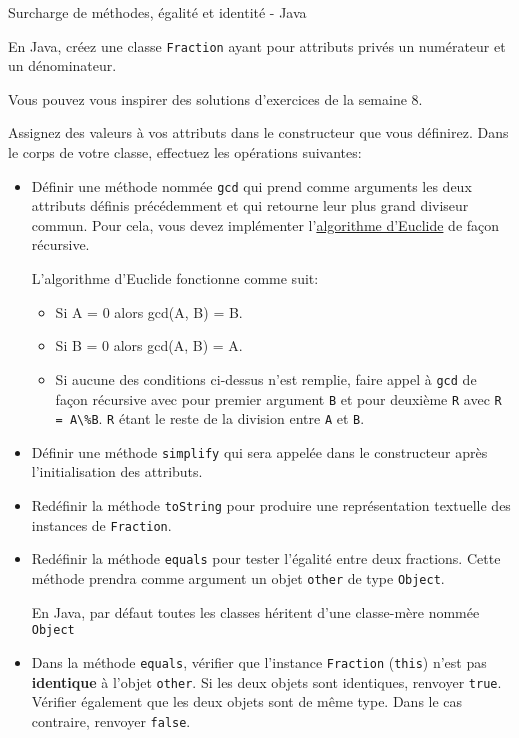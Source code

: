 \begin{Exercice}[30 minutes]{Surcharge de méthodes, égalité et identité - Java}

En Java, créez une classe \lstinline{Fraction} ayant pour attributs privés un numérateur et un dénominateur. 
\begin{conseil}
	Vous pouvez vous inspirer des solutions d'exercices de la semaine 8.
\end{conseil}
Assignez des valeurs à vos attributs dans le constructeur que vous définirez. Dans le corps de votre classe, effectuez les opérations suivantes:
\begin{itemize}
	\item Définir une méthode nommée \lstinline{gcd} qui prend comme arguments les deux attributs définis précédemment et qui retourne leur plus grand diviseur commun. Pour cela, vous devez implémenter l'\href{https://fr.wikipedia.org/wiki/Algorithme_d%27Euclide#:~:text=le%20code%5D-,Principe}{algorithme d'Euclide} de façon récursive.
	\begin{conseil}
		L'algorithme d'Euclide fonctionne comme suit:
		\begin{itemize}
			\item Si A = 0 alors gcd(A, B) = B.
			\item Si B = 0 alors gcd(A, B) = A.
			\item Si aucune des conditions ci-dessus n'est remplie, faire appel à \lstinline{gcd} de façon récursive avec pour premier argument \lstinline{B} et pour deuxième \lstinline{R} avec \lstinline{R = A\%B}. \lstinline{R} étant le reste de la division entre \lstinline{A} et \lstinline{B}.
		\end{itemize}
	\end{conseil}
	\item Définir une méthode \lstinline{simplify} qui sera appelée dans le constructeur après l'initialisation des attributs. 
	\item Redéfinir la méthode \lstinline{toString} pour produire une représentation textuelle des instances de \lstinline{Fraction}.
	\item Redéfinir la méthode \lstinline{equals} pour tester l'égalité entre deux fractions. Cette méthode prendra comme argument un objet \lstinline{other} de type \lstinline{Object}.
	\begin{conseil}
		En Java, par défaut toutes les classes héritent d'une classe-mère nommée \lstinline{Object}
	\end{conseil}
	\item Dans la méthode \lstinline{equals}, vérifier que l'instance \lstinline{Fraction} (\lstinline{this}) n'est pas \textbf{identique} à l'objet \lstinline{other}. Si les deux objets sont identiques, renvoyer \lstinline{true}. Vérifier également que les deux objets sont de même type. Dans le cas contraire, renvoyer \lstinline{false}.

\end{itemize}
\end{Exercice}
